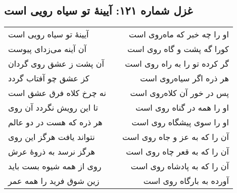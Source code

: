 \begin{center}
\section*{غزل شماره ۱۲۱: آیینهٔ تو سیاه رویی است}
\label{sec:121}
\begin{longtable}{l p{0.5cm} r}
آیینهٔ تو سیاه رویی است
&&
او را چه خبر که ماه‌روی است
\\
آن آینه می‌زدای پیوست
&&
کورا گه پشت و گاه روی است
\\
آن پشت ز عشق روی گردان
&&
گر کرده تو را به راه روی است
\\
کز عشق چو آفتاب گردد
&&
هر ذره اگر سیاه‌روی است
\\
نه چرخ کلاه فرق عشق است
&&
پس در خور آن کلاه‌روی است
\\
تا این رویش نگردد آن روی
&&
او را همه در گناه روی است
\\
هر ذره که هست در دو عالم
&&
او را سوی پیشگاه روی است
\\
نتواند یافت هرگز این روی
&&
آن را که به عز و جاه روی است
\\
هرگز نرسد به ذروهٔ عرش
&&
آن را که به قعر چاه روی است
\\
روی از همه شیوه بست باید
&&
آن را که به پادشاه روی است
\\
زین شوق فرید را همه عمر
&&
آورده به بارگاه روی است
\\
\end{longtable}
\end{center}

